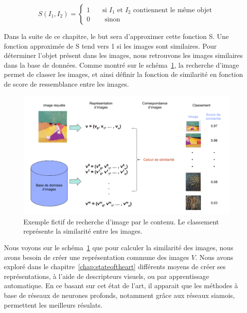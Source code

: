 \begin{equation}
S(I_1, I_2) = 
  \begin{cases}
   1       & \quad \text{si } I_1 \text{ et } I_2 \text{ contiennent le même objet}\\
   0  & \quad \text{ sinon }
  \end{cases}
\label{eq:similarite}
\end{equation}

Dans la suite de ce chapitre, le but sera d'approximer cette fonction S.
Une fonction approximée de S tend vers 1 si les images sont similaires.
Pour déterminer l'objet présent dans les images, nous retrouvons les images similaires dans la base de données. 
Comme montré sur le schéma~\ref{fig:rechercheimage}, la recherche d'image permet de classer les images, et ainsi définir la fonction de similarité en fonction de score de ressemblance entre les images.


\begin{figure}%
\includegraphics[width=\columnwidth]{figures/rechercheimage.png}%
\caption{Exemple fictif de recherche d'image par le contenu. Le classement représente la similarité entre les images.}%
\label{fig:rechercheimage}%
\end{figure}
 
Nous voyons sur le schéma~\ref{fig:rechercheimage} que pour calculer la similarité des images, nous avons besoin de créer une représentation commune des images $V$. Nous avons exploré dans le chapitre~\ref{chap:stateoftheart} différents moyens de créer ses représentations, à l'aide de descripteurs visuels, ou par apprentissage automatique. En ce basant sur cet état de l'art, il apparait que les méthodes à base de réseaux de neurones profonds, notamment grâce aux réseaux siamois, permettent les meilleurs résulats. 

